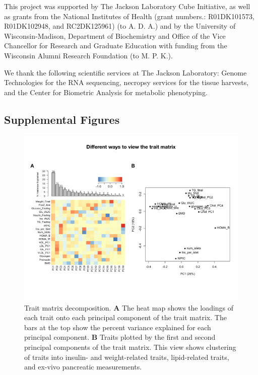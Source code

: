 \documentclass[
]{article}
\newcommand{\beginsupplement}{%
        \setcounter{table}{0}
        \renewcommand{\thetable}{S\arabic{table}}%
        \setcounter{figure}{0}
        \renewcommand{\thefigure}{S\arabic{figure}}%
     }
\begin{document}
This project was supported by The Jackson Laboratory Cube Initiative, as
well as grants from the National Institutes of Health (grant numbers.:
R01DK101573, R01DK102948, and RC2DK125961) (to A. D. A.) and by the
University of Wisconsin-Madison, Department of Biochemistry and Office
of the Vice Chancellor for Research and Graduate Education with funding
from the Wisconsin Alumni Research Foundation (to M. P. K.).

We thank the following scientific services at The Jackson Laboratory:
Genome Technologies for the RNA sequencing, necropsy services for the
tissue harvests, and the Center for Biometric Analysis for metabolic
phenotyping.

\pagebreak
\beginsupplement

\subsection{Supplemental Figures}\label{supplemental-figures}

\begin{figure}[ht!]
\includegraphics[width=\textwidth]{Figures/Supp_Fig_Trait_Decomposition.pdf} 
\caption{Trait matrix decomposition. \textbf{A} The heat map 
shows the loadings of each trait onto each principal component 
of the trait matrix. The bars at the top show the percent variance 
explained for each principal component. \textbf{B} Traits plotted 
by the first and second principal components of the trait matrix. 
This view shows clustering of traits into insulin- and 
weight-related traits, lipid-related traits, and ex-vivo 
pancreatic measurements.
}
\label{fig:trait_decomp}
\end{figure}
\end{document}
